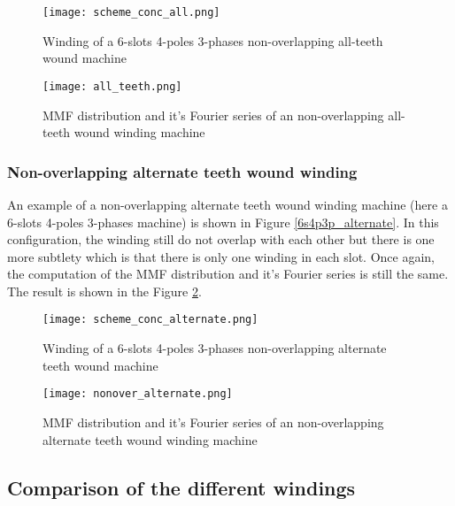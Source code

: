 \begin{figure}[H]
    \begin{minipage}{.45 \textwidth }
        \centering
        \texttt{[image: scheme\_conc\_all.png]}
        \caption{Winding of a 6-slots 4-poles 3-phases non-overlapping all-teeth wound machine}
        \label{6s4p3p_all}
    \end{minipage}
    \begin{minipage}{.45 \textwidth }
        \centering
        \texttt{[image: all\_teeth.png]}
        \caption{MMF distribution and it's Fourier series of an non-overlapping all-teeth wound winding machine}
        \label{mmf_fourier_nonover_all}
    \end{minipage}
\end{figure}

\subsubsection{Non-overlapping alternate teeth wound winding}
An example of a non-overlapping alternate teeth wound winding machine (here a 6-slots 4-poles 3-phases machine) is shown in Figure \ref{6s4p3p_alternate}. In this configuration, the winding still do not overlap with each other but there is one more subtlety which is that there is only one winding in each slot. Once again, the computation of the MMF distribution and it's Fourier series is still the same. The result is shown in the Figure \ref{mmf_fourier_nonover_alternate}.

\begin{figure}[H]
    \begin{minipage}{.45 \textwidth }
        \centering
        \texttt{[image: scheme\_conc\_alternate.png]}
        \caption{Winding of a 6-slots 4-poles 3-phases non-overlapping alternate teeth wound machine}
        \label{6s4p3p_alternate}
    \end{minipage}
    \begin{minipage}{.45 \textwidth }
        \centering
        \texttt{[image: nonover\_alternate.png]}
        \caption{MMF distribution and it's Fourier series of an non-overlapping alternate teeth wound winding machine}
        \label{mmf_fourier_nonover_alternate}
    \end{minipage}
\end{figure}

\subsection{Comparison of the different windings}\label{section_working_principle}
